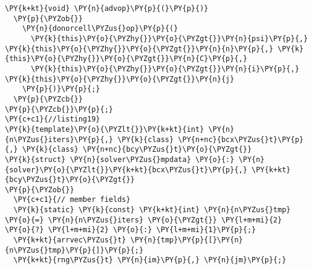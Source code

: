\begin{Verbatim}[commandchars=\\\{\}]
  \PY{k+kt}{void} \PY{n}{advop}\PY{p}{(}\PY{p}{)}
  \PY{p}{\PYZob{}}
    \PY{n}{donorcell\PYZus{}op}\PY{p}{(}
      \PY{k}{this}\PY{o}{\PYZhy{}}\PY{o}{\PYZgt{}}\PY{n}{psi}\PY{p}{,} \PY{k}{this}\PY{o}{\PYZhy{}}\PY{o}{\PYZgt{}}\PY{n}{n}\PY{p}{,} \PY{k}{this}\PY{o}{\PYZhy{}}\PY{o}{\PYZgt{}}\PY{n}{C}\PY{p}{,} 
      \PY{k}{this}\PY{o}{\PYZhy{}}\PY{o}{\PYZgt{}}\PY{n}{i}\PY{p}{,} \PY{k}{this}\PY{o}{\PYZhy{}}\PY{o}{\PYZgt{}}\PY{n}{j}
    \PY{p}{)}\PY{p}{;}
  \PY{p}{\PYZcb{}}
\PY{p}{\PYZcb{}}\PY{p}{;}
\PY{c+c1}{//listing19}
\PY{k}{template}\PY{o}{\PYZlt{}}\PY{k+kt}{int} \PY{n}{n\PYZus{}iters}\PY{p}{,} \PY{k}{class} \PY{n+nc}{bcx\PYZus{}t}\PY{p}{,} \PY{k}{class} \PY{n+nc}{bcy\PYZus{}t}\PY{o}{\PYZgt{}}
\PY{k}{struct} \PY{n}{solver\PYZus{}mpdata} \PY{o}{:} \PY{n}{solver}\PY{o}{\PYZlt{}}\PY{k+kt}{bcx\PYZus{}t}\PY{p}{,} \PY{k+kt}{bcy\PYZus{}t}\PY{o}{\PYZgt{}}
\PY{p}{\PYZob{}}
  \PY{c+c1}{// member fields}
  \PY{k}{static} \PY{k}{const} \PY{k+kt}{int} \PY{n}{n\PYZus{}tmp} \PY{o}{=} \PY{n}{n\PYZus{}iters} \PY{o}{\PYZgt{}} \PY{l+m+mi}{2} \PY{o}{?} \PY{l+m+mi}{2} \PY{o}{:} \PY{l+m+mi}{1}\PY{p}{;}
  \PY{k+kt}{arrvec\PYZus{}t} \PY{n}{tmp}\PY{p}{[}\PY{n}{n\PYZus{}tmp}\PY{p}{]}\PY{p}{;}
  \PY{k+kt}{rng\PYZus{}t} \PY{n}{im}\PY{p}{,} \PY{n}{jm}\PY{p}{;}


\end{Verbatim}
